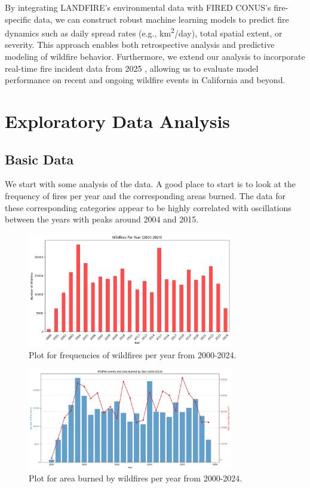 \documentclass{article}
\begin{document}
By integrating LANDFIRE’s environmental data with FIRED CONUS’s fire-specific data, we can construct robust machine learning models to predict fire dynamics such as daily spread rates (e.g., km\textsuperscript{2}/day), total spatial extent, or severity. This approach enables both retrospective analysis and predictive modeling of wildfire behavior. Furthermore, we extend our analysis to incorporate real-time fire incident data from 2025 \cite{calfire2025}, allowing us to evaluate model performance on recent and ongoing wildfire events in California and beyond.


\section{Exploratory Data Analysis}

\subsection{Basic Data}

We start with some analysis of the data. A good place to start is to look at the frequency of fires per year and the corresponding areas burned. The data for these corresponding categories appear to be highly correlated with oscillations between the years with peaks around 2004 and 2015.

\begin{figure}[htbp]
    \centering
    \includegraphics[width=0.8\textwidth]{img/fire_frequency.png}
    \caption{Plot for frequencies of wildfires per year from 2000-2024.}
    \label{fig:fire_frequency}
\end{figure}

\begin{figure}[htbp]
    \centering
    \includegraphics[width=0.8\textwidth]{img/fire_area.png}
    \caption{Plot for area burned by wildfires per year from 2000-2024.}
    \label{fig:fire_area}
\end{figure}
\end{document}
